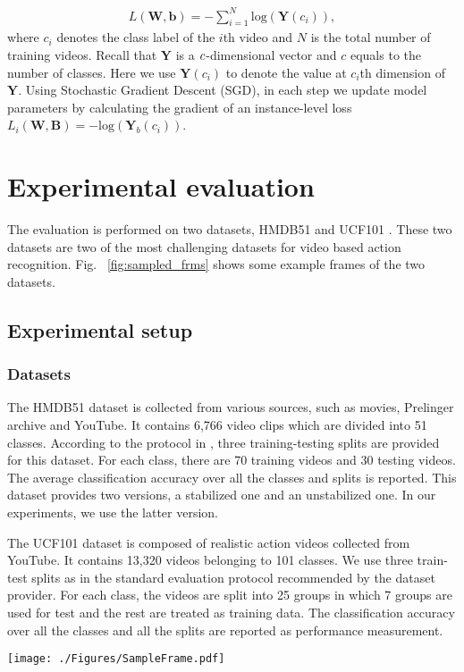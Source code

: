 \documentclass[journal]{IEEEtran}
\begin{document}
\begin{align}
	L(\mathbf{W},\mathbf{b})=-\sum_{i=1}^{N}\mathrm{log}(\mathbf{Y}(c_i)),
\end{align}
where $c_i$ denotes the class label of the $i$th video and $N$ is the total number of training videos. Recall that $\mathbf{Y}$ is a $\emph{c}$-dimensional vector and $c$ equals to the number of classes. Here we use $\mathbf{Y}(c_i)$ to denote the value at $c_i$th dimension of $\mathbf{Y}$. Using Stochastic Gradient Descent (SGD), in each step we update model parameters by calculating the gradient of an instance-level loss $L_i(\mathbf{W},\mathbf{B}) = -\mathrm{log}(\mathbf{Y}_{b}(c_i))$.





\section{Experimental evaluation}
\label{experiment}
The evaluation is performed on two datasets, HMDB51 \cite{Kuehne11} and UCF101 \cite{ucf101}. These two datasets are two of the most challenging datasets for video based action recognition. Fig.~ \ref{fig:sampled_frms}
shows some example frames of the two datasets.

\subsection{Experimental setup}
\subsubsection{Datasets}
The HMDB51 dataset \cite{Kuehne11} is collected from  various sources, such as movies, Prelinger archive and YouTube. It contains 6,766 video clips which are divided into 51 classes. According to the protocol in \cite{Kuehne11}, three training-testing splits are provided for this dataset. For each class, there are 70 training videos and 30 testing videos. The average classification accuracy over all the classes and splits is reported. This dataset provides two versions, a stabilized one and an unstabilized one. In our experiments, we use the latter version.

The UCF101 dataset \cite{ucf101} is composed of realistic action videos collected from YouTube. It contains 13,320 videos belonging to 101 classes. We use three train-test splits as in the standard evaluation protocol recommended by the dataset provider. For each class, the videos are split into 25 groups in which 7 groups are used for test and the rest are treated as training data. The classification
accuracy over all the classes and all the splits are reported as performance measurement.
\begin{figure*}
\begin{center}
\texttt{[image: ./Figures/SampleFrame.pdf]}
\end{center}
   \caption{Example frames from (a) HMDB51 and (b) UCF101.}
\label{fig:sampled_frms}
\end{figure*}
\end{document}
